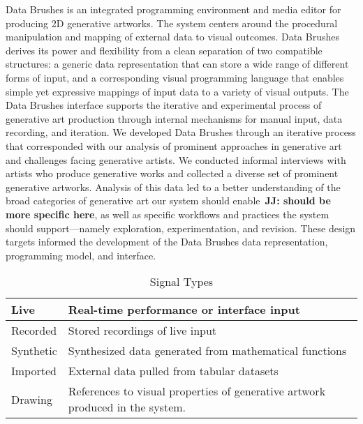 \documentclass{sigchi}
\newcommand {\jen}[1]{{\color{teal}\bf{JJ: #1}\normalfont}}
\begin{document}
Data Brushes is an integrated programming environment and media editor for producing 2D generative artworks. The system centers around the procedural manipulation and mapping of external data to visual outcomes. Data Brushes derives its power and flexibility from a clean separation of two compatible structures: a generic data representation that can store a wide range of different forms of input, and a corresponding visual programming language that enables simple yet expressive mappings of input data to a variety of visual outputs. The Data Brushes interface supports the iterative and experimental process of generative art production through internal mechanisms for manual input, data recording, and iteration. We developed Data Brushes through an iterative process that corresponded with our analysis of prominent approaches in generative art and challenges facing generative artists. We conducted informal interviews with artists who produce generative works and collected a diverse set of prominent generative artworks. Analysis of this data led to a better understanding of the broad categories of generative art our system should enable~\jen{should be more specific here}, as well as specific workflows and practices the system should support---namely exploration, experimentation, and revision. These design targets informed the development of the Data Brushes data representation, programming model, and interface.

\begin{table}
\scriptsize 
 \begin{tabular}{ |p{1.75cm} | p{6.25cm} |}
 \hline
 Live & Real-time performance or interface input \\ \hline
 Recorded & Stored recordings of live input\\ \hline
 Synthetic & Synthesized data generated from mathematical functions\\ \hline
 Imported & External data pulled from tabular datasets\\ \hline
 Drawing &  References to visual properties of generative artwork produced in the system.\\ \hline
 
 \end{tabular}
\caption{Signal Types}
\label{table:signals} 
\vspace{-15pt}
\end{table}
\end{document}
